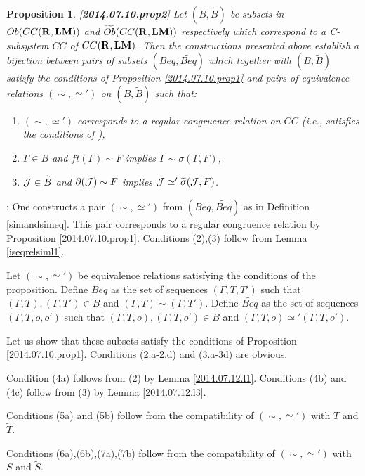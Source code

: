 \documentclass[11pt]{article}
\newenvironment{proof}{{\bf Proof}:}{\vskip 5mm }
\newtheorem{proposition}{Proposition}[subsection]
\newcommand{\llabel}[1]{\label{#1}[{\bf #1}]}
\newcommand{\rr}{{\bf R}}
\newcommand{\lm}{{\bf LM}}
\newcommand{\wt}{\widetilde}
\begin{document}
\begin{proposition}
\llabel{2014.07.10.prop2}
Let $(B,\wt{B})$ be subsets in $Ob(CC(\rr,\lm))$ and $\wt{Ob}(CC(\rr,\lm))$ respectively which correspond to a C-subsystem $CC$ of $CC(\rr,\lm)$. Then the constructions presented above establish a bijection between pairs of subsets $(Beq,\wt{Beq})$ which together with $(B,\wt{B})$ satisfy the conditions of Proposition \ref{2014.07.10.prop1} and pairs of equivalence relations $(\sim,\simeq')$ on $(B,\wt{B})$ such that:
%
\begin{enumerate}
\item $(\sim,\simeq')$ corresponds to a regular congruence relation on $CC$ (i.e., satisfies the conditions of \cite[Proposition 5.4]{Csubsystems}),
%
\item $\Gamma\in B$ and $ft(\Gamma)\sim F$ implies $\Gamma\sim \sigma(\Gamma,F)$,
%
\item ${\cal J}\in \wt{B}$ and $\partial({\cal J})\sim F$ implies ${\cal J}\simeq' \wt{\sigma}({\cal J},F)$.
\end{enumerate}
\end{proposition}
%
\begin{proof}
One constructs a pair $(\sim,\simeq')$ from $(Beq,\wt{Beq})$ as in Definition \ref{simandsimeq}. 
This pair corresponds to a regular congruence relation by Proposition \ref{2014.07.10.prop1}.
Conditions (2),(3) follow from Lemma \ref{iseqrelsiml1}.

Let $(\sim,\simeq')$ be equivalence relations satisfying the conditions of the proposition. Define $Beq$ as the set of sequences $(\Gamma,T,T')$ such that $(\Gamma,T), (\Gamma,T')\in B$ and $(\Gamma,T)\sim (\Gamma,T')$. Define $\wt{Beq}$ as the set of sequences $(\Gamma,T,o,o')$ such that $(\Gamma,T,o),(\Gamma,T,o')\in \wt{B}$ and $(\Gamma,T,o)\simeq' (\Gamma,T,o')$. 

Let us show that these subsets satisfy the conditions of Proposition \ref{2014.07.10.prop1}. Conditions (2.a-2.d) and (3.a-3d) are obvious. 

Condition (4a) follows from (2) by Lemma \ref{2014.07.12.l1}.
Conditions (4b) and (4c) follow from (3) by Lemma \ref{2014.07.12.l3}.

Conditions (5a) and (5b) follow from the compatibility of $(\sim,\simeq')$ with $T$ and $\wt{T}$. 

Conditions (6a),(6b),(7a),(7b) follow from the compatibility of $(\sim,\simeq')$ with $S$ and $\wt{S}$.
\end{proof}


















%
%





\end{document}
